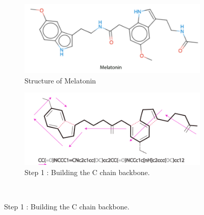 \begin{figure}[H]
     \centering
     \begin{subfigure}[b]{0.495\textwidth}
         \centering
         \includegraphics[width=\textwidth]{4fig/sm4.png}
         \caption{Structure of Melatonin}
         \label{fig:st1}
     \end{subfigure}
     \hfill
     \begin{subfigure}[b]{0.495\textwidth}
         \centering
         \includegraphics[width=\textwidth]{4fig/sm1.png}
         \caption{Step 1 : Building the C chain backbone.}
         \label{fig:st2}
     \end{subfigure}\\


\end{figure}
